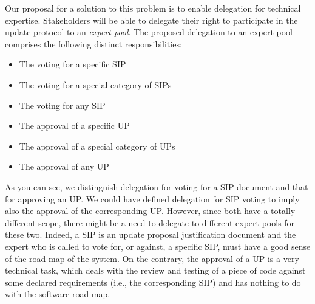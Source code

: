 Our proposal for a solution to this problem is to enable delegation for technical expertise. Stakeholders will be able to delegate their right to participate in the update protocol to an \emph{expert pool}. The proposed delegation to an expert pool comprises the following distinct responsibilities:
\begin{itemize}
\item The voting for a specific SIP
\item The voting for a special category of SIPs
\item The voting for any SIP
\item The approval of a specific UP
\item The approval of a special category of UPs
\item The approval of any UP
\end{itemize}
As you can see, we distinguish delegation for voting for a SIP document and that for approving an UP. We could have defined delegation for SIP voting to imply also the approval of the corresponding UP. However, since both have a totally different scope, there might be a need to delegate to different expert pools for these two. Indeed, a SIP is an update proposal justification document and the expert who is called to vote for, or against, a specific SIP, must have a good sense of the road-map of the system. On the contrary, the approval of a UP is a very technical task, which deals with the review and testing of a piece of code against some declared requirements (i.e., the corresponding SIP) and has nothing to do with the software road-map.

%

